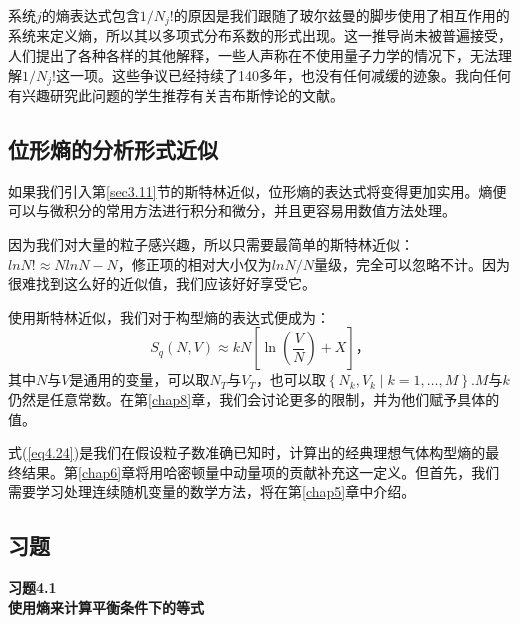 \documentclass[UTF8]{ctexart}
\numberwithin{equation}{section}%
\numberwithin{figure}{section}%
\begin{document}
    \begin{mdframed}[backgroundcolor=lightgray,hidealllines=true]
    
    系统$j$的熵表达式包含$1/N_j!$的原因是我们跟随了玻尔兹曼的脚步使用了相互作用的系统来定义熵，所以其以多项式分布系数的形式出现。这一推导尚未被普遍接受，人们提出了各种各样的其他解释，一些人声称在不使用量子力学的情况下，无法理解$1/N_j!$这一项。这些争议已经持续了140多年，也没有任何减缓的迹象。我向任何有兴趣研究此问题的学生推荐有关吉布斯悖论的文献。
    \end{mdframed}
    \subsection{位形熵的分析形式近似}
    如果我们引入第\ref{sec3.11}节的斯特林近似，位形熵的表达式将变得更加实用。熵便可以与微积分的常用方法进行积分和微分，并且更容易用数值方法处理。

    因为我们对大量的粒子感兴趣，所以只需要最简单的斯特林近似：$lnN!\approx NlnN-N$，修正项的相对大小仅为$ln N/N$量级，完全可以忽略不计。因为很难找到这么好的近似值，我们应该好好享受它。

    使用斯特林近似，我们对于构型熵的表达式便成为：
    \begin{equation}\label{eq4.24}
        S_{q}(N, V) \approx k N\left[\ln \left(\frac{V}{N}\right)+X\right]，
    \end{equation}
    其中$N$与$V$是通用的变量，可以取$N_T$与$V_T$，也可以取$\left\{N_{k}, V_{k} \mid k=1, \ldots, M\right\}$.$M$与$k$仍然是任意常数。在第\ref{chap8}章，我们会讨论更多的限制，并为他们赋予具体的值。

    式(\ref{eq4.24})是我们在假设粒子数准确已知时，计算出的经典理想气体构型熵的最终结果。第\ref{chap6}章将用哈密顿量中动量项的贡献补充这一定义。但首先，我们需要学习处理连续随机变量的数学方法，将在第\ref{chap5}章中介绍。
    \subsection{习题}
    \noindent \textbf{习题4.1}\\
    \textbf{使用熵来计算平衡条件下的等式}
    
\end{document}
